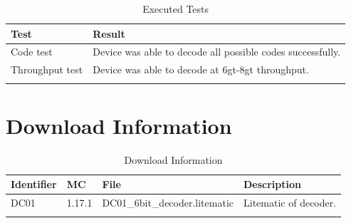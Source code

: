 \documentclass[10pt]{datasheet}
\begin{document}
\begin{table}[h]
\caption{Executed Tests}
\begin{tabularx}{\textwidth}{l | X}
    \thickhline
    \textbf{Test} & \textbf{Result} \\
    \hline
    Code test & Device was able to decode all possible codes successfully.\\
    \hline
    Throughput test & Device was able to decode at 6gt-8gt throughput.\\
    \thickhline
\end{tabularx}
\end{table}

\section{Download Information}
\begin{table}[h]
    \caption{Download Information}
    \begin{tabularx}{\textwidth}{l | l | l | X}
        \thickhline
        \textbf{Identifier} & \textbf{MC} & \textbf{File} & \textbf{Description} \\
        \hline
        DC01 & 1.17.1 & DC01\_6bit\_decoder.litematic & Litematic of decoder. \\
        \thickhline
    \end{tabularx}
\end{table}
\end{document}
